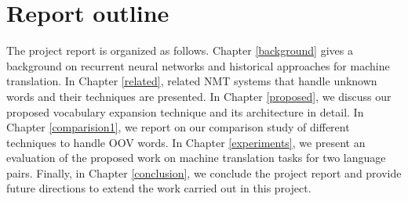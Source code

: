 
\section{Report outline}

The project report is organized as follows. Chapter \ref{background} gives a background on recurrent neural networks and historical approaches for machine translation. In Chapter \ref{related}, related NMT systems that handle unknown words and their techniques are presented. In Chapter \ref{proposed}, we discuss our proposed vocabulary expansion technique and its architecture in detail. In Chapter \ref{comparision1}, we report on our comparison study of different techniques to handle OOV words. In Chapter \ref{experiments}, we present an evaluation of the proposed work on machine translation tasks for two language pairs. Finally, in Chapter \ref{conclusion}, we conclude the project report and provide future directions to extend the work carried out in this project.

%


